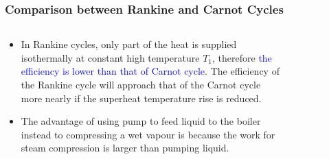 \documentclass[10pt,compress]{beamer}
\begin{document}
\begin{frame}
 \frametitle{Comparison between Rankine and Carnot Cycles}
  \begin{columns}
   \begin{column}[c]{0.4\linewidth}
    \begin{itemize}%
     \item <1-> In Rankine cycles, only part of the heat is supplied isothermally at constant high temperature $T_{1}$, therefore \textcolor{blue}{the efficiency is lower than that of Carnot cycle}. The efficiency of the Rankine cycle will approach that of the Carnot cycle more nearly if the superheat temperature rise is reduced.
     \item <2-> The advantage of using pump to feed liquid to the boiler instead to compressing a wet vapour is because the work for steam compression is larger than pumping liquid.
    \end{itemize}
   \end{column}
   \begin{column}[c]{0.6\linewidth}
    \begin{figure}%
     \begin{center}
      \includegraphics[width=7.5cm,clip]{./Pics/Comparison_Rankine_Carnot}
     \end{center}
    \end{figure}  
   \end{column}
  \end{columns}
 \normalsize
\end{frame}
\end{document}
